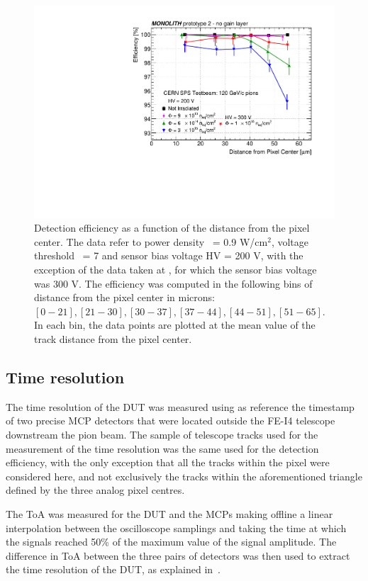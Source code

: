 		\begin{figure}[h]
			\centering
			\includegraphics[width=.75\textwidth]{files/MONOLITH_Irradiated_paper/Radius_efficiency}
			\caption{Detection efficiency as a function of the distance from the pixel center. The data refer to power density \power~= 0.9 W/cm$^2$, voltage threshold  \vth~= 7 \noise and sensor bias voltage HV = 200 V, with the exception of the data taken at \maxflu, for which the sensor bias voltage was 300 V. The efficiency was computed in the following bins of distance from the pixel center in microns: $[0-21], [21-30], [30-37], [37-44], [44-51], [51-65]$. In each bin, the data points are plotted at the mean value of the track distance from the pixel center.}
			\label{im:MONO-IR_Eff_vs_distance}
		\end{figure}



		\subsection{Time resolution}
		The time resolution of the DUT was measured using as reference the timestamp of two precise MCP detectors that were located outside the FE-I4 telescope downstream the pion beam. 
		The sample of telescope tracks used for the measurement of the time resolution was the same used for the detection efficiency, with the only exception that all the tracks within the pixel were considered here, and not exclusively the tracks within the aforementioned triangle defined by the three analog pixel centres. 

		The ToA was measured for the DUT and the MCPs making offline a linear interpolation between the oscilloscope samplings and taking the time at which the signals reached 50\% of the maximum value of the signal amplitude.
		The difference in ToA between the three pairs of detectors was then used to extract the time resolution of the DUT, as explained in~\cite{Monolith_20ps}. 

